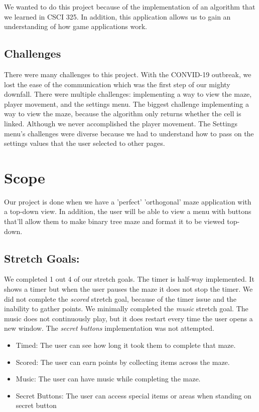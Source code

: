 \documentclass[10pt,conference,onecolumn,compsoc]{IEEEtran}
\begin{document}
We wanted to do this project because of the implementation of an algorithm that we learned in CSCI 325. In addition, this application allows us to gain an understanding of how game applications work.


\subsection{Challenges}
There were many challenges to this project. With the CONVID-19 outbreak, we lost the ease of the communication which was the first step of our mighty downfall. There were multiple challenges: implementing a way to view the maze, player movement, and the settings menu. The biggest challenge implementing a way to view the maze, because the algorithm only returns whether the cell is linked. Although we never accomplished the player movement. The Settings menu's challenges were diverse because we had to understand how to pass on the settings values that the user selected to other pages.

\section{Scope}
Our project is done when we have a 'perfect' 'orthogonal' maze application with a top-down view. In addition, the user will be able to view a menu with buttons that'll allow them to make binary tree maze and format it to be viewed top-down. 
\subsection{Stretch Goals:}
We completed 1 out 4 of our stretch goals.  The timer is half-way implemented. It shows a timer but when the user pauses the maze it does not stop the timer. We did not complete the \textit{scored} stretch goal, because of the timer issue and the inability to gather points. We minimally completed the \textit{music} stretch goal. The music does not continuously play, but it does restart every time the user opens a new window. The \textit{secret buttons} implementation was not attempted.
\begin{itemize}
\item Timed: The user can see how long it took them to complete that maze.
\item Scored: The user can earn points by collecting items across the maze.
\item Music: The user can have music while completing the maze.
\item Secret Buttons: The user can access special items or areas when standing on secret button

\end{itemize}
\end{document}
